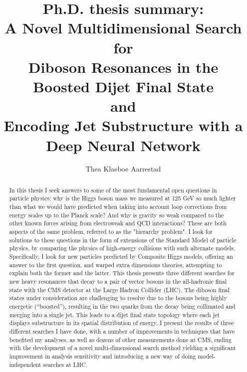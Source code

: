 \documentclass{pasa}%
\title[PhD thesis summary]{ \bfseries\Large\centering
    \textbf{Ph.D. thesis summary:}\\
    A Novel Multidimensional Search for\\ 
    Diboson Resonances in the Boosted Dijet Final State\\
    and\\
    Encoding Jet Substructure with a Deep Neural Network\\
}
\author[Thea Klaeboe Aarrestad]{Thea Klaeboe Aarrestad
\affil{University of Zurich}
}
\begin{document}
\begin{frontmatter}
\maketitle
\begin{abstract}
In this thesis I seek answers to some of the most fundamental open questions in particle physics: why is the Higgs boson mass we measured at 125 GeV so much lighter than what we would have predicted when taking into account loop corrections from energy scales up to the Planck scale? And why is gravity so weak compared to the other known forces arising from electroweak and QCD interactions? These are both aspects of the same problem, referred to as the "hierarchy problem". I look for solutions to these questions in the form of extensions of the Standard Model of particle physics, by comparing the physics of high-energy collisions with such alternate models. Specifically, I look for new particles predicted by Composite Higgs models, offering an answer to the first question, and warped extra dimensions theories, attempting to explain both the former and the latter. This thesis presents three different searches for new heavy resonances that decay to a pair of vector bosons in the all-hadronic final state with the CMS detector at the Large Hadron Collider (LHC). The diboson final states under consideration are challenging to resolve due to the bosons being highly energetic (“boosted”), resulting in the two quarks from the decay being collimated and merging into a single jet. This leads to a dijet final state topology where each jet displays substructure in its spatial distribution of energy. I present the results of three different searches I have done, with a number of improvements in techniques that have benefited my analyses, as well as dozens of other measurements done at CMS, ending with the development of a novel multi-dimensional search method yielding a significant improvement in analysis sensitivity and introducing a new way of doing model-independent searches at LHC. 


\end{abstract}
\end{frontmatter}
\end{document}
